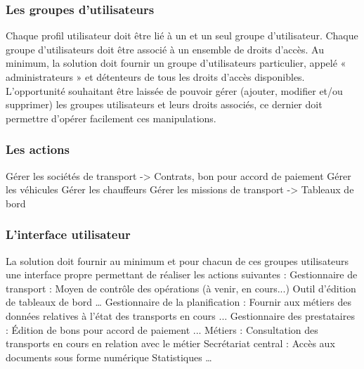 \documentclass[11pt,fleqn]{book} %
\begin{document}
\subsubsection{Les groupes d'utilisateurs}
Chaque profil utilisateur doit être lié à un et un seul groupe d'utilisateur.
Chaque groupe d'utilisateurs doit être associé à un ensemble de droits d'accès.
Au minimum, la solution doit fournir un groupe d'utilisateurs particulier, appelé « administrateurs » et détenteurs de tous les droits d'accès disponibles. L'opportunité souhaitant être laissée de pouvoir gérer (ajouter, modifier et/ou supprimer) les groupes utilisateurs et leurs droits associés, ce dernier doit permettre d'opérer facilement ces manipulations.

\subsubsection{Les actions}
Gérer les sociétés de transport -> Contrats, bon pour accord de paiement
Gérer les véhicules
Gérer les chauffeurs
Gérer les missions de transport -> Tableaux de bord

\subsubsection{L'interface utilisateur}
La solution doit fournir au minimum et pour chacun de ces groupes utilisateurs une interface propre permettant de réaliser les actions suivantes :
Gestionnaire de transport :
Moyen de contrôle des opérations (à venir, en cours...)
Outil d'édition de tableaux de bord
…
Gestionnaire de la planification :
Fournir aux métiers des données relatives à l'état des transports en cours
...
Gestionnaire des prestataires :
Édition de bons pour accord de paiement
...
Métiers :
Consultation des transports en cours en relation avec le métier
Secrétariat central :
Accès aux documents sous forme numérique
Statistiques
…
\end{document}
